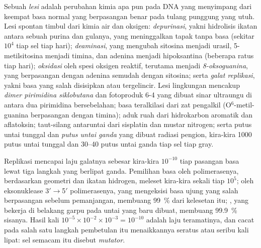 \begin{definition}\label{def:b3:dna-repair:lesions}
%
Sebuah \emph{lesi} adalah perubahan kimia apa pun pada DNA yang menyimpang
dari keempat basa normal yang berpasangan benar pada tulang punggung yang
utuh. Lesi spontan timbul dari kimia air dan oksigen: \emph{depurinasi},
yakni hidrolisis ikatan antara sebuah purina dan gulanya, yang meninggalkan
tapak tanpa basa (sekitar $10^{4}$ tiap sel tiap hari); \emph{deaminasi},
yang mengubah sitosina menjadi urasil, 5-metilsitosina menjadi timina, dan
adenina menjadi hipoksantina (beberapa ratus tiap hari); \emph{oksidasi} oleh
spesi oksigen reaktif, terutama menjadi \emph{8-oksoguanina}, yang
berpasangan dengan adenina semudah dengan sitosina; serta \emph{galat
replikasi}, yakni basa yang salah disisipkan atau tergelincir. Lesi
lingkungan mencakup \emph{dimer pirimidina siklobutana} dan fotoproduk 6-4
yang dibuat sinar ultraungu di antara dua pirimidina bersebelahan; basa
teralkilasi dari zat pengalkil (O$^{6}$-metil-guanina berpasangan dengan
timina); aduk ruah dari hidrokarbon aromatik dan aflatoksin; taut-silang
antaruntai dari sisplatin dan mustar nitrogen; serta putus untai tunggal dan
\emph{putus untai ganda} yang dibuat radiasi pengion, kira-kira \num{1000}
putus untai tunggal dan \numrange{30}{40} putus untai ganda tiap sel tiap
gray.
\end{definition}

\begin{proposition}\label{prop:b3:dna-repair:fidelity}
Replikasi mencapai laju galatnya sebesar kira-kira $10^{-10}$ tiap pasangan
basa lewat tiga langkah yang berlipat ganda. Pemilihan basa oleh
polimerasenya, berdasarkan geometri dan ikatan hidrogen, meleset kira-kira
sekali tiap $10^{5}$; \emph{} oleh eksonuklease 3$'\to$5$'$
polimerasenya, yang mengeksisi basa ujung yang salah berpasangan sebelum
pemanjangan, membuang \qty{99}{\%} dari kelesetan itu; \emph{}, yang bekerja di belakang garpu pada untai yang baru dibuat, membuang
\qty{99.9}{\%} sisanya. Hasil kali
$10^{-5}\times 10^{-2}\times 10^{-3} = 10^{-10}$ adalah laju teramatinya, dan
cacat pada salah satu langkah pembetulan itu menaikkannya seratus atau seribu
kali lipat: sel semacam itu disebut \emph{mutator}.
\end{proposition}

